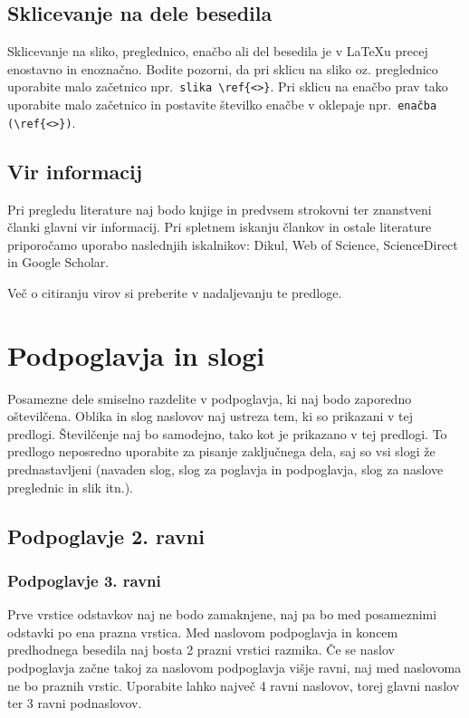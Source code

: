 \subsection{Sklicevanje na dele besedila}\label{sec:sklici}

Sklicevanje na sliko, preglednico, enačbo ali del besedila je v \LaTeX u precej enostavno in enoznačno. Bodite pozorni, da pri sklicu na sliko oz. preglednico uporabite malo začetnico npr.\ \verb|slika \ref{<>}|. Pri sklicu na enačbo prav tako uporabite malo začetnico in postavite številko enačbe v oklepaje npr.\ \verb|enačba (\ref{<>})|.


\subsection{Vir informacij}\label{sec:vir_informacij}
Pri pregledu literature naj bodo knjige in predvsem strokovni ter znanstveni članki glavni vir informacij. Pri spletnem iskanju člankov in ostale literature priporočamo uporabo naslednjih iskalnikov: Dikul, Web of Science, ScienceDirect in Google Scholar.

Več o citiranju virov si preberite v nadaljevanju te predloge.

\section{Podpoglavja in slogi}\label{sec:podpoglavja}
Posamezne dele smiselno razdelite v podpoglavja, ki naj bodo zaporedno oštevilčena. Oblika in slog naslovov naj ustreza tem, ki so prikazani v tej predlogi. Številčenje naj bo samodejno, tako kot je prikazano v tej predlogi. To predlogo neposredno uporabite za pisanje zaključnega dela, saj so vsi slogi že prednastavljeni (navaden slog, slog za poglavja in podpoglavja, slog za naslove preglednic in slik itn.).

\subsection{Podpoglavje 2. ravni}\label{sec:poglavje_2}
\subsubsection{Podpoglavje 3. ravni}\label{sec:poglavje_3}

Prve vrstice odstavkov naj ne bodo zamaknjene, naj pa bo med posameznimi odstavki po ena prazna vrstica. Med naslovom podpoglavja in koncem predhodnega besedila naj bosta 2 prazni vrstici razmika. Če se naslov podpoglavja začne takoj za naslovom podpoglavja višje ravni, naj med naslovoma ne bo praznih vrstic. Uporabite lahko največ 4 ravni naslovov, torej glavni naslov ter 3 ravni podnaslovov.

